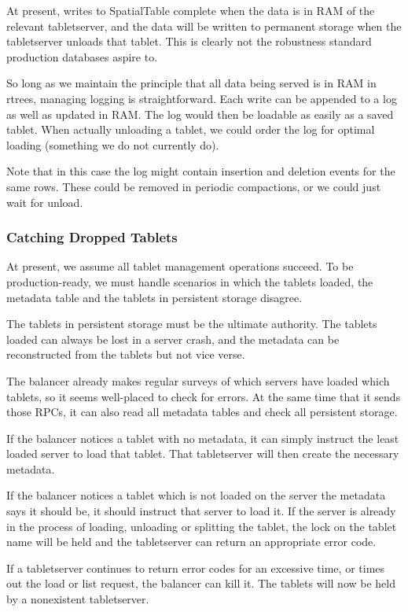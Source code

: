 \documentclass[11pt]{article}
\begin{document}
At present, writes to SpatialTable complete when the data is in RAM of the relevant tabletserver, and the data will be written to permanent storage when the tabletserver unloads that tablet.  This is clearly not the robustness standard production databases aspire to.

So long as we maintain the principle that all data being served is in RAM in rtrees, managing logging is straightforward.  Each write can be appended to a log as well as updated in RAM.  The log would then be loadable as easily as a saved tablet.  When actually unloading a tablet, we could order the log for optimal loading (something we do not currently do).

Note that in this case the log might contain insertion and deletion events for the same rows.  These could be removed in periodic compactions, or we could just wait for unload.

\subsubsection{Catching Dropped Tablets}

At present, we assume all tablet management operations succeed.  To be production-ready, we must handle scenarios in which the tablets loaded, the metadata table and the tablets in persistent storage disagree.

The tablets in persistent storage must be the ultimate authority.  The tablets loaded can always be lost in a server crash, and the metadata can be reconstructed from the tablets but not vice verse.

The balancer already makes regular surveys of which servers have loaded which tablets, so it seems well-placed to check for errors.  At the same time that it sends those RPCs, it can also read all metadata tables and check all persistent storage.

If the balancer notices a tablet with no metadata, it can simply instruct the least loaded server to load that tablet.  That tabletserver will then create the necessary metadata.

If the balancer notices a tablet which is not loaded on the server the metadata says it should be, it should instruct that server to load it.  If the server is already in the process of loading, unloading or splitting the tablet, the lock on the tablet name will be held and the tabletserver can return an appropriate error code.

If a tabletserver continues to return error codes for an excessive time, or times out the load or list request, the balancer can kill it.  The tablets will now be held by a nonexistent tabletserver.
\end{document}
